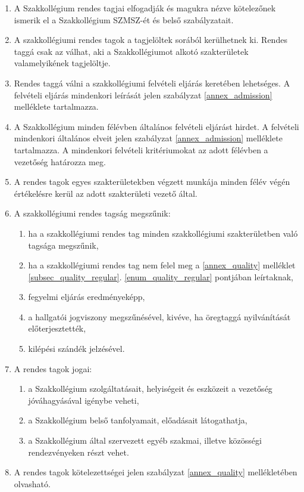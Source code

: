 \documentclass[12pt]{report}
\begin{document}
\begin{enumerate}
  \item A Szakkollégium rendes tagjai elfogadják és magukra nézve kötelezőnek ismerik el a Szakkollégium SZMSZ-ét és belső szabályzatait.
  \item A szakkollégiumi rendes tagok a tagjelöltek sorából kerülhetnek ki. Rendes taggá csak az válhat, aki a Szakkollégiumot alkotó szakterületek valamelyikének tagjelöltje.
  \item Rendes taggá válni a szakkollégiumi felvételi eljárás keretében lehetséges. A felvételi eljárás mindenkori leírását jelen szabályzat \ref{annex_admission} melléklete tartalmazza.
  \item A Szakkollégium minden félévben általános felvételi eljárást hirdet. A felvételi mindenkori általános elveit jelen szabályzat \ref{annex_admission} melléklete tartalmazza. 
    A mindenkori felvételi kritériumokat az adott félévben a vezetőség határozza meg.
  \item A rendes tagok egyes szakterületekben végzett munkája minden félév végén értékelésre kerül az adott szakterületi vezető által.
  
  \item A szakkollégiumi rendes tagság megszűnik:
  \begin{enumerate}
    \item ha a szakkollégiumi rendes tag minden szakkollégiumi szakterületben való tagsága megszűnik,
    \item ha a szakkollégiumi rendes tag nem felel meg a \ref{annex_quality} melléklet \ref{subsec_quality_regular}. \ref{enum_quality_regular} pontjában leírtaknak,
    \item fegyelmi eljárás eredményeképp,
    \item a hallgatói jogviszony megszűnésével, kivéve, ha öregtaggá nyilvánítását előterjesztették,
    \item kilépési szándék jelzésével.
  \end{enumerate}

  \item A rendes tagok jogai: \label{enum_member_rights}
  \begin{enumerate}
    \item a Szakkollégium  szolgáltatásait, helyiségeit és eszközeit a vezetőség jóváhagyásával igénybe veheti,
    \item a Szakkollégium belső tanfolyamait, előadásait látogathatja,
    \item a Szakkollégium által szervezett egyéb szakmai, illetve közösségi rendezvényeken részt vehet.
  \end{enumerate}

  \item A rendes tagok kötelezettségei jelen szabályzat \ref{annex_quality} mellékletében olvasható.
\end{enumerate}
\end{document}

